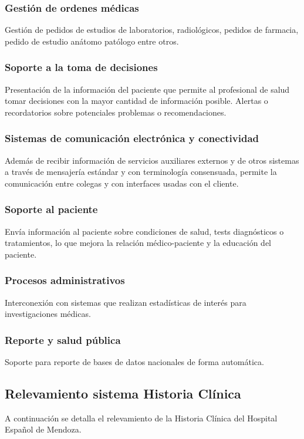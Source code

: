 \subsubsection{Gestión de ordenes médicas}
Gestión de pedidos de estudios de laboratorios, radiológicos, pedidos de farmacia, pedido de estudio anátomo patólogo entre otros. 

\subsubsection{Soporte a la toma de decisiones}
Presentación de la información del paciente que permite al profesional de salud tomar decisiones con la mayor cantidad de información posible. Alertas o recordatorios sobre potenciales problemas o recomendaciones.

\subsubsection{Sistemas de comunicación electrónica y conectividad}
Además de recibir información de servicios auxiliares externos y de otros sistemas a través de mensajería estándar y con terminología consensuada, permite la comunicación entre colegas y con interfaces usadas con el cliente.

\subsubsection{Soporte al paciente}
Envía información al paciente sobre condiciones de salud, tests diagnósticos o tratamientos, lo que mejora la relación médico-paciente y la educación del paciente.

\subsubsection{Procesos administrativos}
Interconexión con sistemas que realizan estadísticas de interés para investigaciones médicas.

\subsubsection{Reporte y salud pública}
Soporte para reporte de bases de datos nacionales de forma automática.

\subsection{Relevamiento sistema Historia Clínica}
A continuación se detalla el relevamiento de la Historia Clínica del Hospital Español de Mendoza.

